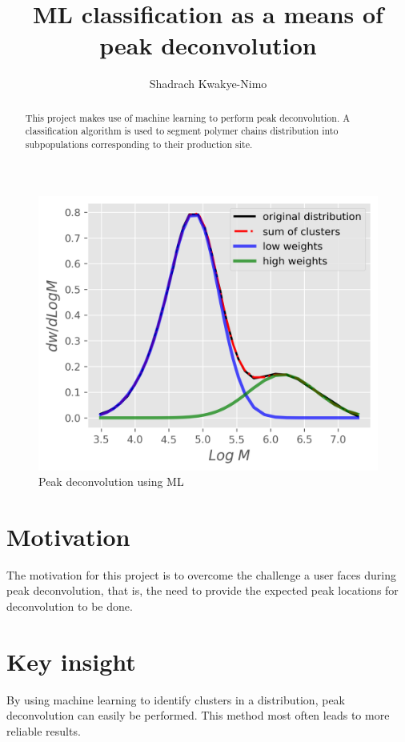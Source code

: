 \documentclass[12pt,letter]{article}
\begin{document}
\title{ML classification as a means of peak deconvolution}
\author{Shadrach Kwakye-Nimo}
\maketitle



\begin{figure}[!htb]
	\begin{center}
	\includegraphics[scale=1]{figures/deconvoluted}
	\caption{Peak deconvolution using ML}
	\end{center}
\end{figure}



\begin{abstract}
This project makes use of machine learning to perform peak deconvolution. A classification algorithm is used to segment polymer chains distribution into subpopulations corresponding to their production site.
\end{abstract}


\section*{Motivation}
The motivation for this project is to overcome the challenge a user faces during peak deconvolution, that is, the need to provide the expected peak locations for deconvolution to be done.

\section*{Key insight}
By using machine learning to identify clusters in a distribution, peak deconvolution can easily be performed. This method most often leads to more reliable results.
\end{document}

